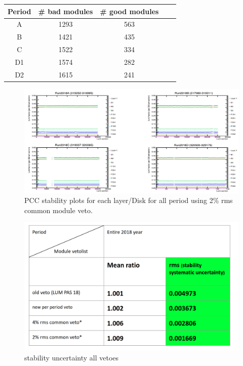 \begin{table}[!ht]
\centering
{}
\begin{tabular}{ccccc}
    \textbf{Period} & \textbf{# bad modules} & \textbf{# good modules} \\ \hline
    A & 1293 & 563  \\
    B & 1421  & 435  \\
    C & 1522  & 334 \\
    D1 & 1574  & 282  \\
   D2  & 1615  & 241 \\
\end{tabular}
\label{tab:pccvis_diffveto}
\end{table}



\begin{figure}[!htp]
\centering
\includegraphics[width=1\textwidth]{ashish_thesis/pcc_layer_disk_stability_2per_veto.png}
\caption{%
PCC stability plots for each layer/Disk for all period using 2\% rms common module veto.
}
\label{fig:pcclayerdisktwopercommonveto}
\end{figure}

\begin{figure}[!htp]
\centering
\includegraphics[width=1\textwidth]{ashish_thesis/stability_unc_diff_veto.png}
\caption{%
stability uncertainty all vetoes
}
\label{fig:stabilityuncallveto}
\end{figure}


